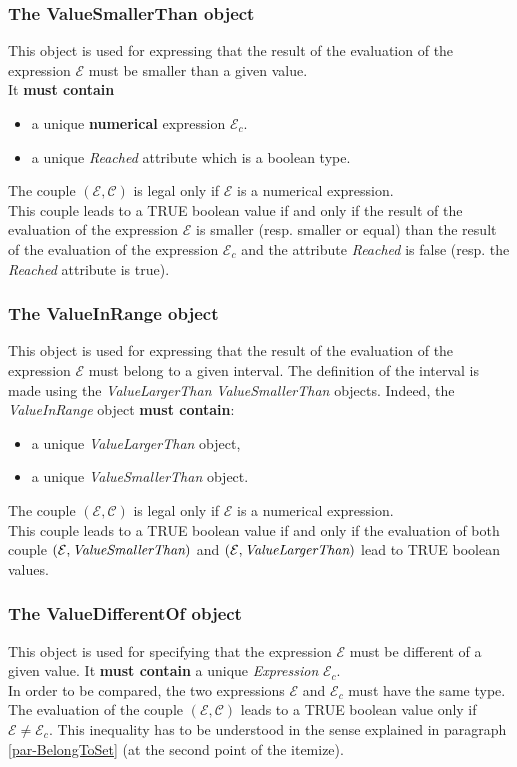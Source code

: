\documentclass[a4paper,11pt] {article}
\begin{document}
\subsubsection{The ValueSmallerThan object}
This object is used for expressing that the result of the evaluation of the expression $\mathcal E$ 
must be smaller than a given value.\\
It {\bf must contain}
\begin{itemize}
\item a unique {\bf numerical} expression $\mathcal E_c$. 
\item a unique {\it Reached} attribute which is a boolean type.
\end{itemize}
The couple $(\mathcal E, \mathcal C)$ is legal only if $\mathcal E$ is a numerical expression.\\
This couple leads to a TRUE boolean value if and only if 
the result of the evaluation of the expression $\mathcal E$ is smaller (resp. smaller or equal) than the result of the evaluation of the expression $\mathcal E_c$ and the attribute {\it Reached} is false (resp. the {\it Reached} attribute is true).

\subsubsection{The ValueInRange object}
This object is used for expressing that the result of the evaluation of the expression $\mathcal E$ must belong to a given interval. The definition of the interval is made using the {\it ValueLargerThan} {\it ValueSmallerThan} objects. 
Indeed, the {\it ValueInRange} object {\bf must contain}:
\begin{itemize}
\item a unique {\it ValueLargerThan} object,
\item a unique {\it ValueSmallerThan} object. 
\end{itemize}
The couple $(\mathcal E, \mathcal C)$ is legal only if $\mathcal E$ is a numerical expression.\\
This couple leads to a TRUE boolean value if and only if the evaluation of both couple 
$(\mathcal E, \mbox{\it ValueSmallerThan})$ and $(\mathcal E, \mbox{\it ValueLargerThan})$ lead to TRUE boolean values.

\subsubsection{The ValueDifferentOf object}
This object is used for specifying that the expression $\mathcal E$ must be different of a given value.
It {\bf must contain} a unique {\it Expression} $\mathcal E_c$.\\
In order to be compared, the two expressions $\mathcal E$ and $\mathcal E_c$ must have the same type.
The evaluation of the couple $(\mathcal E, \mathcal C)$  leads to a TRUE boolean value only if $\mathcal E \neq \mathcal E_c$. This inequality has to be understood in the sense explained in paragraph \ref{par-BelongToSet} (at the second point of the itemize).
\end{document}
